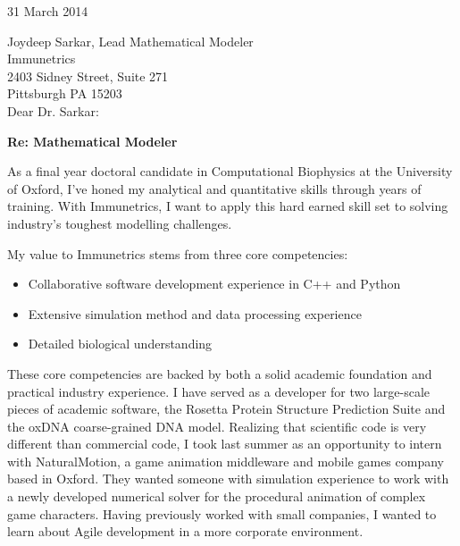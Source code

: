 \documentclass{../res}
\begin{document}
 
\begin{sloppypar}
 
%


\begin{resume} 
 
31 March 2014

Joydeep Sarkar, Lead Mathematical Modeler \\
Immunetrics \\
2403 Sidney Street, Suite 271 \\
Pittsburgh PA 15203 \\

Dear Dr. Sarkar:

\textbf{Re: Mathematical Modeler}

As a final year doctoral candidate in Computational Biophysics at the University of Oxford, I've honed my analytical and quantitative skills through years of training. With Immunetrics, I want to apply this hard earned skill set to solving industry's toughest modelling challenges. 

My value to Immunetrics stems from three core competencies: 
\begin{itemize}[itemindent=1cm]
    \item Collaborative software development experience in C++ and Python
    \item Extensive simulation method and data processing experience
    \item Detailed biological understanding
\end{itemize}

These core competencies are backed by both a solid academic foundation and practical industry experience. I have served as a developer for two large-scale pieces of academic software, the Rosetta Protein Structure Prediction Suite and the oxDNA coarse-grained DNA model. Realizing that scientific code is very different than commercial code, I took last summer as an opportunity to intern with NaturalMotion, a game animation middleware and mobile games company based in Oxford. They wanted someone with simulation experience to work with a newly developed numerical solver for the procedural animation of complex game characters. Having previously worked with small companies, I wanted to learn about Agile development in a more corporate environment. 


\end{resume}
\end{sloppypar}
\end{document}
